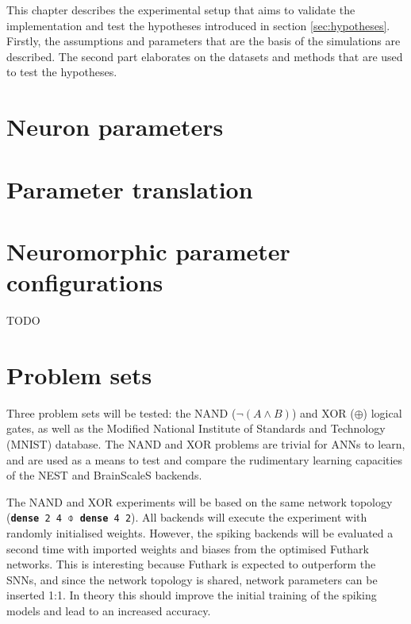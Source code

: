 \documentclass[report.tex]{subfiles}
\begin{document}
This chapter describes the experimental setup that aims to validate the
implementation and test the hypotheses introduced in section \ref{sec:hypotheses}.
Firstly, the assumptions and parameters that are the basis of the simulations are described. The second part elaborates on the datasets and methods that are used to test the hypotheses.

\section{Neuron parameters}


\section{Parameter translation} \label{sec:translation}


\section{Neuromorphic parameter configurations}
TODO

\section{Problem sets}
Three problem sets will be tested: the NAND ($\neg(A \land B)$) and XOR
($\oplus$) logical gates, as well as the 
Modified National Institute of Standards and Technology
(MNIST) database.
The NAND and XOR problems are trivial for \glspl{ANN} to learn, and are used as
a means to test and compare the rudimentary learning capacities of the NEST and
BrainScaleS backends.

The NAND and XOR experiments will be based on the same network topology
(\texttt{\textbf{dense} 2 4 $\obar$ \textbf{dense} 4 2}). 
All backends will execute the experiment with randomly initialised weights. However, the spiking backends will be evaluated
a second time with imported weights and biases from the optimised Futhark
networks.
This is interesting because Futhark is expected to outperform the \glspl{SNN}, and since the
network topology is shared, network parameters can be inserted 1:1.
In theory this should improve the initial training of the spiking models and
lead to an increased accuracy.
\end{document}

